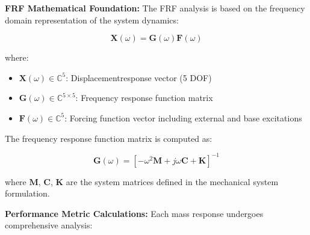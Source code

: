 \documentclass[12pt,a4paper]{article}
\begin{document}
\textbf{FRF Mathematical Foundation:} The FRF analysis is based on the frequency domain representation of the system dynamics:

\begin{equation}\label{Eq.frequency_domain_system_detailed}
\mathbf{X}(\omega) = \mathbf{G}(\omega) \mathbf{F}(\omega)
\end{equation}

where:
\begin{itemize}
    \item $\mathbf{X}(\omega) \in \mathbb{C}^{5}$: Displacementresponse vector (5 DOF)
    \item $\mathbf{G}(\omega) \in \mathbb{C}^{5 \times 5}$: Frequency response function matrix
    \item $\mathbf{F}(\omega) \in \mathbb{C}^{5}$: Forcing function vector including external and base excitations
\end{itemize}

The frequency response function matrix is computed as:

\begin{equation}\label{Eq.frf_matrix_detailed}
\mathbf{G}(\omega) = \left[ -\omega^2 \mathbf{M} + j\omega \mathbf{C} + \mathbf{K} \right]^{-1}
\end{equation}

where $\mathbf{M}$, $\mathbf{C}$, $\mathbf{K}$ are the system matrices defined in the mechanical system formulation.


\textbf{Performance Metric Calculations:} Each mass response undergoes comprehensive analysis:
\end{document}
